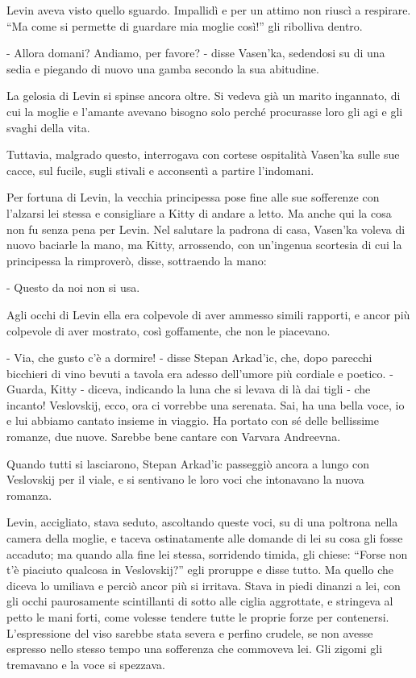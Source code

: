 Levin aveva visto quello sguardo. Impallidì e per un attimo non riuscì a respirare. ``Ma come si permette di guardare mia moglie così!'' gli ribolliva dentro. 

- Allora domani? Andiamo, per favore? - disse Vasen'ka, sedendosi su di una sedia e piegando di nuovo una gamba secondo la sua abitudine. 

La gelosia di Levin si spinse ancora oltre. Si vedeva già un marito ingannato, di cui la moglie e l'amante avevano bisogno solo perché procurasse loro gli agi e gli svaghi della vita. 

Tuttavia, malgrado questo, interrogava con cortese ospitalità Vasen'ka sulle sue cacce, sul fucile, sugli stivali e acconsentì a partire l'indomani. 

Per fortuna di Levin, la vecchia principessa pose fine alle sue sofferenze con l'alzarsi lei stessa e consigliare a Kitty di andare a letto. Ma anche qui la cosa non fu senza pena per Levin. Nel salutare la padrona di casa, Vasen'ka voleva di nuovo baciarle la mano, ma Kitty, arrossendo, con un'ingenua scortesia di cui la principessa la rimproverò, disse, sottraendo la mano: 

- Questo da noi non si usa. 

Agli occhi di Levin ella era colpevole di aver ammesso simili rapporti, e ancor più colpevole di aver mostrato, così goffamente, che non le piacevano. 

- Via, che gusto c'è a dormire! - disse Stepan Arkad'ic, che, dopo parecchi bicchieri di vino bevuti a tavola era adesso dell'umore più cordiale e poetico. - Guarda, Kitty - diceva, indicando la luna che si levava di là dai tigli - che incanto! Veslovskij, ecco, ora ci vorrebbe una serenata. Sai, ha una bella voce, io e lui abbiamo cantato insieme in viaggio. Ha portato con sé delle bellissime romanze, due nuove. Sarebbe bene cantare con Varvara Andreevna. 

Quando tutti si lasciarono, Stepan Arkad'ic passeggiò ancora a lungo con Veslovskij per il viale, e si sentivano le loro voci che intonavano la nuova romanza. 

Levin, accigliato, stava seduto, ascoltando queste voci, su di una poltrona nella camera della moglie, e taceva ostinatamente alle domande di lei su cosa gli fosse accaduto; ma quando alla fine lei stessa, sorridendo timida, gli chiese: ``Forse non t'è piaciuto qualcosa in Veslovskij?'' egli proruppe e disse tutto. Ma quello che diceva lo umiliava e perciò ancor più si irritava. Stava in piedi dinanzi a lei, con gli occhi paurosamente scintillanti di sotto alle ciglia aggrottate, e stringeva al petto le mani forti, come volesse tendere tutte le proprie forze per contenersi. L'espressione del viso sarebbe stata severa e perfino crudele, se non avesse espresso nello stesso tempo una sofferenza che commoveva lei. Gli zigomi gli tremavano e la voce si spezzava. 

